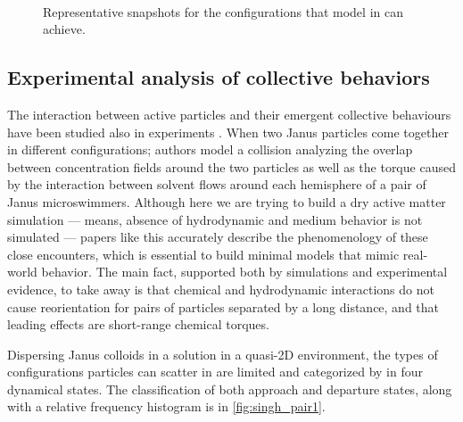 \documentclass[../../master_thesis_np.tex]{subfiles}
\begin{document}
	\begin{figure}[htp]
		\centering
		 \\
		\caption{Representative snapshots for the configurations that model in \cite{negi_emergent_2022} can achieve.}
		\label{fig:negi_vision2}
	\end{figure}
	
	\subsection{Experimental analysis of collective behaviors}
	The interaction between active particles and their emergent collective behaviours have been studied also in experiments \cite{singh_pair_2024}. 
	When two  Janus particles come together in different configurations; authors model a collision analyzing the overlap between concentration fields around the two particles as well as the torque caused by the interaction between solvent flows around each hemisphere of a pair of Janus microswimmers. %
	Although here we are trying to build a dry active matter simulation --- means, absence of hydrodynamic and medium behavior is not simulated --- papers like this accurately describe the phenomenology of these close encounters, which is essential to build minimal models that mimic real-world behavior. 
	The main fact, supported both by simulations and experimental evidence, to take away is that chemical and hydrodynamic interactions do not cause reorientation for pairs of particles separated by a long distance, and that leading effects are short-range chemical torques.%
	
	Dispersing Janus colloids in a  solution in a quasi-2D environment, the types of configurations particles can scatter in are limited and categorized by \citeauthor{singh_pair_2024} in four dynamical states. 
	The classification of both approach and departure states, along with a relative frequency histogram is in \ref{fig:singh_pair1}.
	
\end{document}
